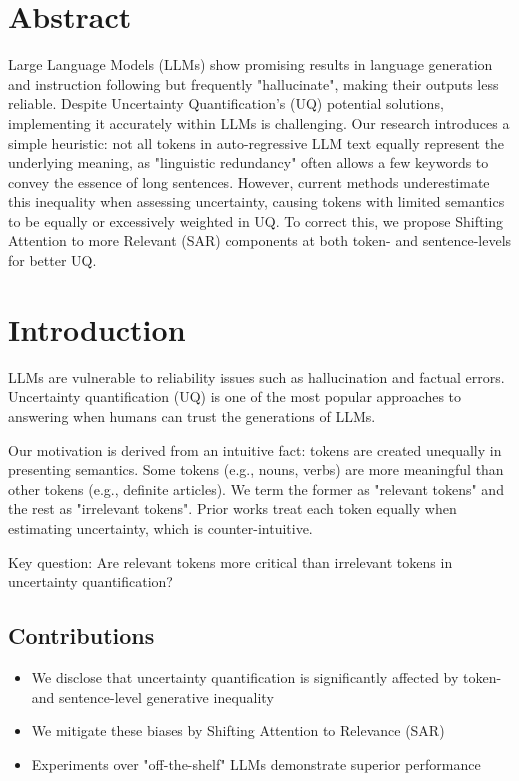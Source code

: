 
\section{Abstract}
Large Language Models (LLMs) show promising results in language generation and instruction following but frequently "hallucinate", making their outputs less reliable. Despite Uncertainty Quantification's (UQ) potential solutions, implementing it accurately within LLMs is challenging. Our research introduces a simple heuristic: not all tokens in auto-regressive LLM text equally represent the underlying meaning, as "linguistic redundancy" often allows a few keywords to convey the essence of long sentences. However, current methods underestimate this inequality when assessing uncertainty, causing tokens with limited semantics to be equally or excessively weighted in UQ. To correct this, we propose Shifting Attention to more Relevant (SAR) components at both token- and sentence-levels for better UQ.

\section{Introduction}
LLMs are vulnerable to reliability issues such as hallucination and factual errors. Uncertainty quantification (UQ) is one of the most popular approaches to answering when humans can trust the generations of LLMs.

Our motivation is derived from an intuitive fact: tokens are created unequally in presenting semantics. Some tokens (e.g., nouns, verbs) are more meaningful than other tokens (e.g., definite articles). We term the former as "relevant tokens" and the rest as "irrelevant tokens". Prior works treat each token equally when estimating uncertainty, which is counter-intuitive.

Key question: Are relevant tokens more critical than irrelevant tokens in uncertainty quantification?

\subsection{Contributions}
\begin{itemize}
\item We disclose that uncertainty quantification is significantly affected by token- and sentence-level generative inequality
\item We mitigate these biases by Shifting Attention to Relevance (SAR)
\item Experiments over "off-the-shelf" LLMs demonstrate superior performance
\end{itemize}

